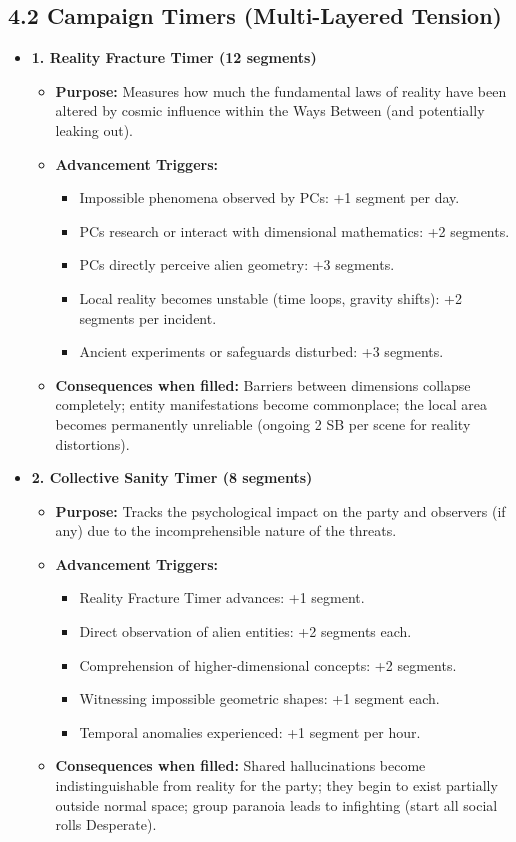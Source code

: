 \documentclass[11pt]{article}
\begin{document}
\clearpage

\subsection*{4.2 Campaign Timers (Multi-Layered Tension)}

\begin{itemize}
\item \textbf{1. Reality Fracture Timer (12 segments)}
\begin{itemize}
\item \textbf{Purpose:} Measures how much the fundamental laws of reality have been altered by cosmic influence within the Ways Between (and potentially leaking out).
\item \textbf{Advancement Triggers:}
\begin{itemize}
\item Impossible phenomena observed by PCs: +1 segment per day.
\item PCs research or interact with dimensional mathematics: +2 segments.
\item PCs directly perceive alien geometry: +3 segments.
\item Local reality becomes unstable (time loops, gravity shifts): +2 segments per incident.
\item Ancient experiments or safeguards disturbed: +3 segments.
\end{itemize}
\item \textbf{Consequences when filled:} Barriers between dimensions collapse completely; entity manifestations become commonplace; the local area becomes permanently unreliable (ongoing 2 SB per scene for reality distortions).
\end{itemize}

\item \textbf{2. Collective Sanity Timer (8 segments)}
\begin{itemize}
\item \textbf{Purpose:} Tracks the psychological impact on the party and observers (if any) due to the incomprehensible nature of the threats.
\item \textbf{Advancement Triggers:}
\begin{itemize}
\item Reality Fracture Timer advances: +1 segment.
\item Direct observation of alien entities: +2 segments each.
\item Comprehension of higher-dimensional concepts: +2 segments.
\item Witnessing impossible geometric shapes: +1 segment each.
\item Temporal anomalies experienced: +1 segment per hour.
\end{itemize}
\item \textbf{Consequences when filled:} Shared hallucinations become indistinguishable from reality for the party; they begin to exist partially outside normal space; group paranoia leads to infighting (start all social rolls Desperate).
\end{itemize}


\end{itemize}
\end{document}
